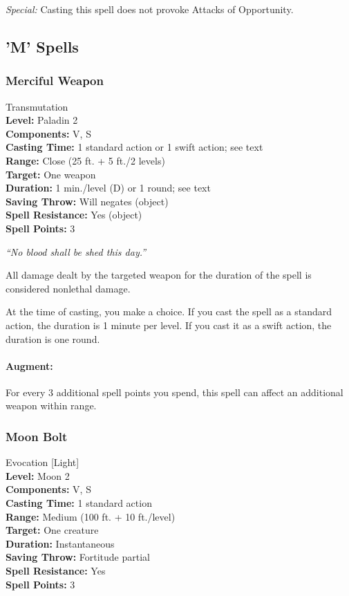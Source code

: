\emph{Special:} Casting this spell does not provoke Attacks of Opportunity.
\subsection{'M' Spells}
\subsubsection{Merciful Weapon}
\label{Spell:MercifulWeapon}
Transmutation
\\ \textbf{Level:} Paladin 2
\\ \textbf{Components:} V, S
\\ \textbf{Casting Time:} 1 standard action or 1 swift action; see text
\\ \textbf{Range:} Close (25 ft. + 5 ft./2 levels)
\\ \textbf{Target:} One weapon
\\ \textbf{Duration:} 1 min./level (D) or 1 round; see text
\\ \textbf{Saving Throw:} Will negates (object)
\\ \textbf{Spell Resistance:} Yes (object)
\\ \textbf{Spell Points:} 3

\emph{``No blood shall be shed this day.''}

All damage dealt by the targeted weapon for the duration of the spell is considered nonlethal damage.

At the time of casting, you make a choice. If you cast the spell as a standard action, the duration is 1 minute per level. 
If you cast it as a swift action, the duration is one round.

\paragraph{Augment:} For every 3 additional spell points you spend, this spell can affect an additional weapon within range.

\subsubsection{Moon Bolt}
\label{Spell:MoonBolt}
Evocation [Light]
\\ \textbf{Level:} Moon 2
\\ \textbf{Components:} V, S
\\ \textbf{Casting Time:} 1 standard action
\\ \textbf{Range:} Medium (100 ft. + 10 ft./level)
\\ \textbf{Target:} One creature
\\ \textbf{Duration:} Instantaneous
\\ \textbf{Saving Throw:} Fortitude partial
\\ \textbf{Spell Resistance:} Yes
\\ \textbf{Spell Points:} 3

